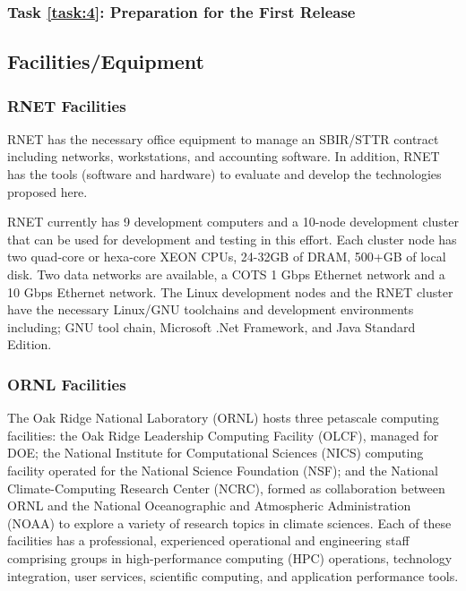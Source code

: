 \label{task:4}
\subsubsection{Task \ref{task:4}: Preparation for the First Release }



\subsection{Facilities/Equipment}
\subsubsection{RNET Facilities}
RNET has the necessary office equipment to manage an SBIR/STTR contract
including networks, workstations, and accounting software. In
addition, RNET has the tools (software and hardware) to evaluate and
develop the technologies proposed here.  

RNET currently has 9 development computers and a 10-node development cluster 
that can be used for development and testing in this effort. Each cluster node 
has two quad-core or hexa-core XEON CPUs, 24-32GB of DRAM, 500+GB of local 
disk. 
Two data networks are available, a COTS 1 Gbps Ethernet network and a 10 Gbps 
Ethernet network. The Linux development nodes and the RNET cluster have the 
necessary Linux/GNU toolchains and development environments including; GNU 
tool chain, Microsoft .Net Framework, and Java Standard Edition.

\subsubsection{ORNL Facilities}
The Oak Ridge National Laboratory (ORNL) hosts three petascale computing 
facilities: the Oak Ridge Leadership Computing 
Facility (OLCF), managed for DOE; the National Institute for Computational 
Sciences (NICS) computing facility operated 
for the National Science Foundation (NSF); and the National Climate-Computing 
Research Center (NCRC), formed as 
collaboration between ORNL and the National Oceanographic and Atmospheric 
Administration (NOAA) to explore a variety of 
research topics in climate sciences. Each of these facilities has a 
professional, experienced operational and engineering 
staff comprising groups in high-performance computing (HPC) operations, 
technology integration, user services, scientific 
computing, and application performance tools.

